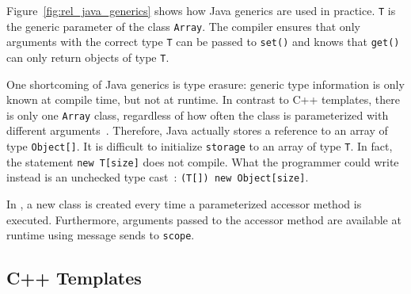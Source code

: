 Figure~\ref{fig:rel_java_generics} shows how Java generics are used in practice. \texttt{T} is the generic parameter of the class \texttt{Array}. The compiler ensures that only arguments with the correct type \texttt{T} can be passed to \texttt{set()} and knows that \texttt{get()} can only return objects of type \texttt{T}. 

One shortcoming of Java generics is type erasure: generic type information is only known at compile time, but not at runtime. In contrast to C++ templates, there is only one \texttt{Array} class, regardless of how often the class is parameterized with different arguments~\cite{lembcke2006specialization}. Therefore, Java actually stores a reference to an array of type \texttt{Object[]}. It is difficult to initialize \texttt{storage} to an array of type \texttt{T}. In fact, the statement \texttt{new T[size]} does not compile. What the programmer could write instead is an unchecked type cast~\cite{nino2007cost}: \texttt{(T[]) new Object[size]}.

In \msname, a new class is created every time a parameterized accessor method is executed. Furthermore, arguments passed to the accessor method are available at runtime using message sends to \texttt{scope}.

\subsection{C++ Templates}